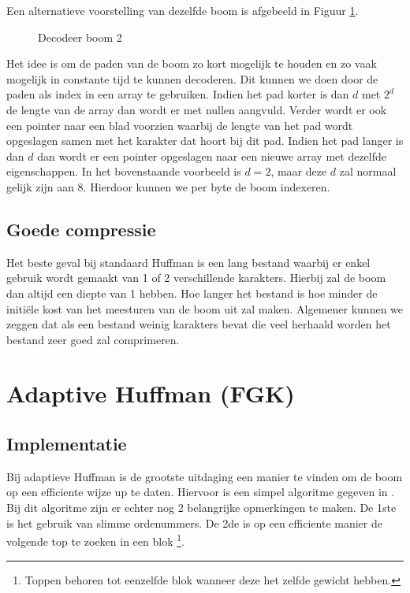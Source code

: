 \documentclass[twoside,twocolumn]{article}
\begin{document}
            Een alternatieve voorstelling van dezelfde boom is afgebeeld in Figuur \ref{decodeer-boom-moeilijk}.
            \begin{figure}[H]
               
               \caption{Decodeer boom 2}
               \label{decodeer-boom-moeilijk}
            \end{figure}
            Het idee is om de paden van de boom zo kort mogelijk te houden en zo vaak mogelijk in constante tijd te kunnen decoderen.
            Dit kunnen we doen door de paden als index in een array te gebruiken.
            Indien het pad korter is dan $d$ met $2^d$ de lengte van de array dan wordt er met
            nullen aangvuld. Verder wordt er ook een pointer naar een blad voorzien waarbij de lengte van
             het pad wordt opgeslagen samen met het karakter dat hoort bij dit pad.
            Indien het pad langer is dan $d$ dan wordt er een pointer opgeslagen naar een nieuwe array met dezelfde eigenschappen. 
            In het bovenstaande voorbeeld is $d=2$, maar deze $d$ zal normaal gelijk zijn   
            aan 8. Hierdoor kunnen we per byte de boom indexeren.
    \subsection{Goede compressie}
    Het beste geval bij standaard Huffman is een lang bestand waarbij er enkel gebruik wordt gemaakt van 1 of 2 verschillende karakters. Hierbij zal de boom dan altijd een diepte van 1 hebben. Hoe langer het bestand is hoe minder de initiële kost van het meesturen van de boom uit zal maken. Algemener kunnen we zeggen dat als een bestand weinig karakters bevat die veel herhaald worden het bestand zeer goed zal comprimeren.

\section{Adaptive Huffman (FGK)}
    
    \subsection{Implementatie}
        Bij adaptieve Huffman is de grootste uitdaging een manier te vinden om de boom op een efficiente wijze up te daten. 
        Hiervoor is een simpel algoritme gegeven in \cite{cursusAD3}. 
        Bij dit algoritme zijn er echter nog 2 belangrijke opmerkingen te maken.
        De 1ste is het gebruik van slimme ordenummers. De 2de is op een efficiente manier 
        de volgende top te zoeken in een blok
        \footnote{Toppen behoren tot eenzelfde blok wanneer deze het zelfde gewicht hebben.}.
\end{document}
